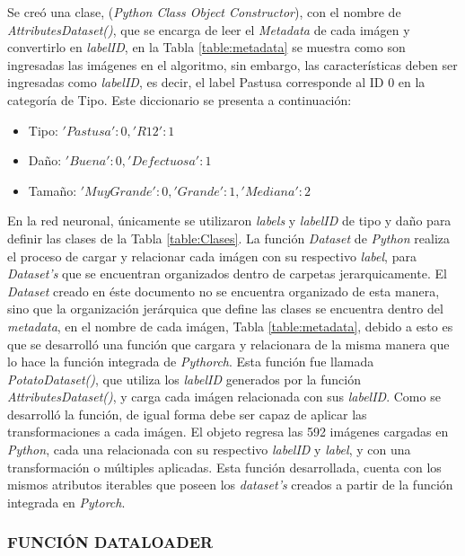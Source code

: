 			Se creó una clase, (\textit{Python Class Object Constructor}), con el nombre de \textit{AttributesDataset()}, que se encarga de leer el \textit{Metadata}  de cada imágen y convertirlo en \textit{labelID}, en la Tabla \ref{table:metadata} se muestra como son ingresadas las imágenes en el algoritmo, sin embargo, las características deben ser ingresadas como \textit{labelID}, es decir, el label Pastusa corresponde al ID 0 en la categoría de Tipo. Este diccionario se presenta a continuación:			
	
			\begin{itemize}
				\item Tipo: ${'Pastusa': 0, 'R12': 1}$
				\item Daño: ${'Buena': 0, 'Defectuosa': 1}$
				\item Tamaño: ${'Muy Grande': 0, 'Grande': 1, 'Mediana': 2}$
			\end{itemize}

			En la red neuronal, únicamente se utilizaron \textit{labels} y \textit{labelID} de tipo y daño para definir las clases de la Tabla \ref{table:Clases}. La función \textit{Dataset} de \textit{Python} realiza el proceso de cargar y relacionar cada imágen con su respectivo \textit{label}, para \textit{Dataset's} que se encuentran organizados dentro de carpetas jerarquicamente. El \textit{Dataset} creado en éste documento no se encuentra organizado de esta manera, sino que la organización jerárquica que define las clases se encuentra dentro del \textit{metadata}, en el nombre de cada imágen, Tabla \ref{table:metadata}, debido a esto es que se desarrolló una función que cargara y relacionara de la misma manera que lo hace la función integrada de \textit{Pythorch}. Esta función fue llamada \textit{PotatoDataset()}, que utiliza los \textit{labelID} generados por la función \textit{AttributesDataset()}, y carga cada imágen relacionada con sus \textit{labelID}. Como se desarrolló la función, de igual forma debe ser capaz de aplicar las transformaciones a cada imágen. El objeto regresa las 592 imágenes cargadas en \textit{Python}, cada una relacionada con su respectivo \textit{labelID} y \textit{label}, y con una transformación o múltiples aplicadas. Esta función desarrollada, cuenta con los mismos atributos iterables que poseen los \textit{dataset's} creados a partir de la función integrada en \textit{Pytorch}.			
			
		
			\subsubsection{FUNCIÓN DATALOADER}			
						
